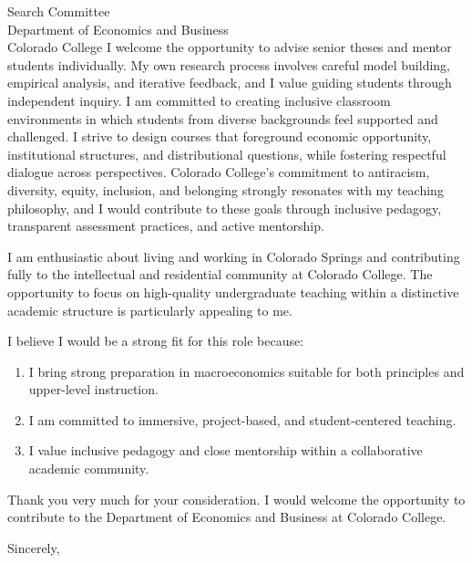\documentclass[11pt,letterpaper]{letter}
\begin{document}
\begin{letter}{
Search Committee \\
Department of Economics and Business \\
Colorado College
}
I welcome the opportunity to advise senior theses and mentor students individually. My own research process involves careful model building, empirical analysis, and iterative feedback, and I value guiding students through independent inquiry. I am committed to creating inclusive classroom environments in which students from diverse backgrounds feel supported and challenged. I strive to design courses that foreground economic opportunity, institutional structures, and distributional questions, while fostering respectful dialogue across perspectives. Colorado College’s commitment to antiracism, diversity, equity, inclusion, and belonging strongly resonates with my teaching philosophy, and I would contribute to these goals through inclusive pedagogy, transparent assessment practices, and active mentorship.

I am enthusiastic about living and working in Colorado Springs and contributing fully to the intellectual and residential community at Colorado College. The opportunity to focus on high-quality undergraduate teaching within a distinctive academic structure is particularly appealing to me.

I believe I would be a strong fit for this role because:
\begin{enumerate}
    \item I bring strong preparation in macroeconomics suitable for both principles and upper-level instruction.
    \item I am committed to immersive, project-based, and student-centered teaching.
    \item I value inclusive pedagogy and close mentorship within a collaborative academic community.
\end{enumerate}

Thank you very much for your consideration. I would welcome the opportunity to contribute to the Department of Economics and Business at Colorado College.

\closing{Sincerely,}

\end{letter}
\end{document}
